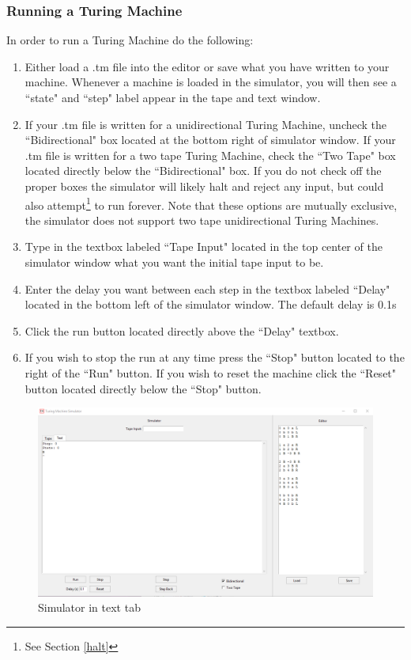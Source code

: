 \documentclass[12pt,letterpaper]{article}
\begin{document}
	\subsubsection{Running a Turing Machine}
	\noindent In order to run a Turing Machine do the following:
	\begin{enumerate}
		\item Either load a .tm file into the editor or save what you have written to your machine. Whenever a machine is loaded in the simulator, you will then see a ``state" and ``step" label appear in the tape and text window.
		\item If your .tm file is written for a unidirectional Turing Machine, uncheck the ``Bidirectional" box located at the bottom right of simulator window. If your .tm file is written for a two tape Turing Machine, check the ``Two Tape" box located directly below the ``Bidirectional" box. If you do not check off the proper boxes the simulator will likely halt and reject any input, but could also attempt\footnote{See Section \ref{halt}} to run forever. Note that these options are mutually exclusive, the simulator does not support two tape unidirectional Turing Machines.
		\item Type in the textbox labeled ``Tape Input" located in the top center of the simulator window what you want the initial tape input to be.
		\item Enter the delay you want between each step in the textbox labeled ``Delay" located in the bottom left of the simulator window. The default delay is 0.1s
		\item Click the run button located directly above the ``Delay" textbox. 
		\item If you wish to stop the run at any time press the ``Stop" button located to the right of the ``Run" button. If you wish to reset the machine click the ``Reset" button located directly below the ``Stop" button.
	\end{enumerate}

	\begin{figure}[hbt!]
		\includegraphics[scale=.4]{images/simulator_text.png}
		\caption{Simulator in text tab}
	\end{figure}
\end{document}
